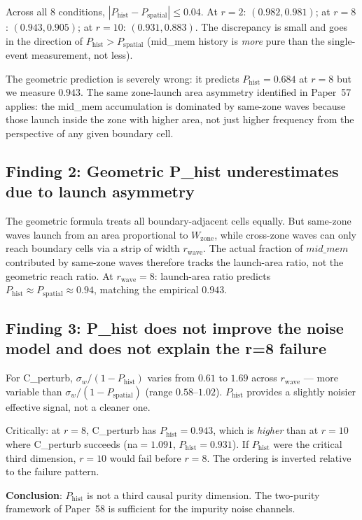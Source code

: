 \documentclass[11pt,a4paper]{article}
\newcommand{\Psp}{P_{\mathrm{spatial}}}
\newcommand{\Phist}{P_{\mathrm{hist}}}
\begin{document}
Across all 8 conditions, $|\Phist - \Psp| \leq 0.04$.
At $r=2$: $(0.982, 0.981)$; at $r=8$: $(0.943, 0.905)$; at $r=10$: $(0.931, 0.883)$.
The discrepancy is small and goes in the direction of $\Phist > \Psp$
(mid\_mem history is \emph{more} pure than the single-event measurement, not less).

The geometric prediction is severely wrong: it predicts $\Phist = 0.684$ at $r=8$
but we measure $0.943$.
The same zone-launch area asymmetry identified in Paper~57 applies:
the mid\_mem accumulation is dominated by same-zone waves because those
launch inside the zone with higher area, not just higher frequency
from the perspective of any given boundary cell.

\subsection{Finding 2: Geometric P\_hist underestimates due to launch asymmetry}

The geometric formula treats all boundary-adjacent cells equally.
But same-zone waves launch from an area proportional to $W_\mathrm{zone}$,
while cross-zone waves can only reach boundary cells via a strip of width $r_\mathrm{wave}$.
The actual fraction of $mid\_mem$ contributed by same-zone waves therefore
tracks the launch-area ratio, not the geometric reach ratio.
At $r_\mathrm{wave}=8$: launch-area ratio predicts $\Phist \approx \Psp \approx 0.94$,
matching the empirical $0.943$.

\subsection{Finding 3: P\_hist does not improve the noise model and does not explain the r=8 failure}

For C\_perturb, $\sigma_w/(1-\Phist)$ varies from $0.61$ to $1.69$ across $r_\mathrm{wave}$
--- more variable than $\sigma_w/(1-\Psp)$ (range $0.58$--$1.02$).
$\Phist$ provides a slightly noisier effective signal, not a cleaner one.

Critically: at $r=8$, C\_perturb has $\Phist=0.943$, which is \emph{higher}
than at $r=10$ where C\_perturb succeeds (na$=1.091$, $\Phist=0.931$).
If $\Phist$ were the critical third dimension, $r=10$ would fail before $r=8$.
The ordering is inverted relative to the failure pattern.

\textbf{Conclusion}: $\Phist$ is not a third causal purity dimension.
The two-purity framework of Paper~58 is sufficient for the impurity noise channels.
\end{document}
